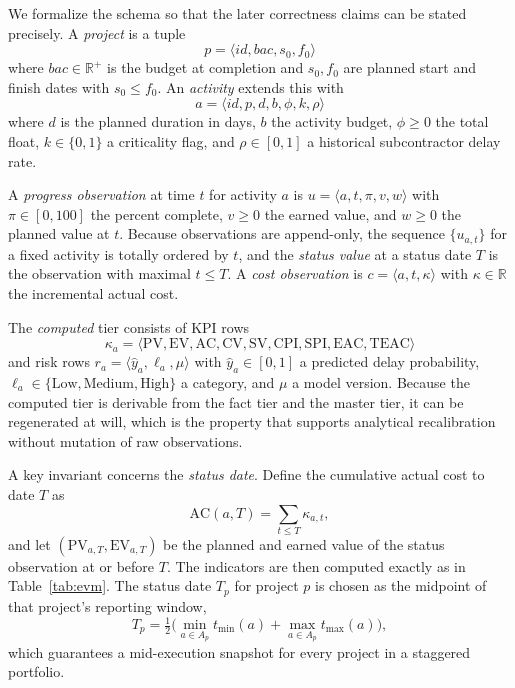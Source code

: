 \documentclass[conference]{IEEEtran}
\begin{document}
We formalize the schema so that the later correctness claims can be stated precisely. A \emph{project} is a tuple
\begin{equation}
p = \langle \mathit{id}, \mathit{bac}, s_0, f_0 \rangle
\end{equation}
where $\mathit{bac} \in \mathbb{R}^+$ is the budget at completion and $s_0, f_0$ are planned start and finish dates with $s_0 \le f_0$. An \emph{activity} extends this with
\begin{equation}
a = \langle \mathit{id}, p, d, b, \phi, k, \rho \rangle
\end{equation}
where $d$ is the planned duration in days, $b$ the activity budget, $\phi \ge 0$ the total float, $k \in \{0,1\}$ a criticality flag, and $\rho \in [0,1]$ a historical subcontractor delay rate.

A \emph{progress observation} at time $t$ for activity $a$ is $u = \langle a, t, \pi, v, w \rangle$ with $\pi \in [0,100]$ the percent complete, $v \ge 0$ the earned value, and $w \ge 0$ the planned value at $t$. Because observations are append-only, the sequence $\{u_{a,t}\}$ for a fixed activity is totally ordered by $t$, and the \emph{status value} at a status date $T$ is the observation with maximal $t \le T$. A \emph{cost observation} is $c = \langle a, t, \kappa \rangle$ with $\kappa \in \mathbb{R}$ the incremental actual cost.

The \emph{computed} tier consists of KPI rows
\begin{equation}
\kappa_a = \big\langle \mathrm{PV}, \mathrm{EV}, \mathrm{AC}, \mathrm{CV}, \mathrm{SV}, \mathrm{CPI}, \mathrm{SPI}, \mathrm{EAC}, \mathrm{TEAC} \big\rangle
\end{equation}
and risk rows $r_a = \langle \hat{y}_a, \ell_a, \mu \rangle$ with $\hat{y}_a \in [0,1]$ a predicted delay probability, $\ell_a \in \{\text{Low},\text{Medium},\text{High}\}$ a category, and $\mu$ a model version. Because the computed tier is derivable from the fact tier and the master tier, it can be regenerated at will, which is the property that supports analytical recalibration without mutation of raw observations.

A key invariant concerns the \emph{status date}. Define the cumulative actual cost to date $T$ as
\begin{equation}
\mathrm{AC}(a,T) = \sum_{t \le T} \kappa_{a,t},
\end{equation}
and let $(\mathrm{PV}_{a,T}, \mathrm{EV}_{a,T})$ be the planned and earned value of the status observation at or before $T$. The indicators are then computed exactly as in Table~\ref{tab:evm}. The status date $T_p$ for project $p$ is chosen as the midpoint of that project's reporting window,
\begin{equation}
T_p = \tfrac{1}{2}\big(\min_{a \in A_p} t_{\min}(a) + \max_{a \in A_p} t_{\max}(a)\big),
\end{equation}
which guarantees a mid-execution snapshot for every project in a staggered portfolio.
\end{document}
